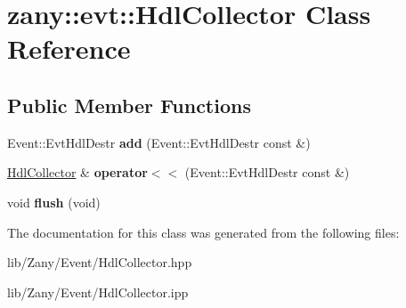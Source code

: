 \hypertarget{classzany_1_1evt_1_1_hdl_collector}{}\section{zany\+:\+:evt\+:\+:Hdl\+Collector Class Reference}
\label{classzany_1_1evt_1_1_hdl_collector}
\subsection*{Public Member Functions}
\begin{DoxyCompactItemize}
\item 
\mbox{\label{classzany_1_1evt_1_1_hdl_collector_af4565ac45b97605568eebecf9308f8c1}} 
Event\+::\+Evt\+Hdl\+Destr {\bfseries add} (Event\+::\+Evt\+Hdl\+Destr const \&)
\item 
\mbox{\label{classzany_1_1evt_1_1_hdl_collector_aa0b0fce2626676b0ecedeaac9995fd45}} 
\hyperlink{classzany_1_1evt_1_1_hdl_collector}{Hdl\+Collector} \& {\bfseries operator$<$$<$} (Event\+::\+Evt\+Hdl\+Destr const \&)
\item 
\mbox{\label{classzany_1_1evt_1_1_hdl_collector_a0598e2ee7d011c08046274a6f4f717b9}} 
void {\bfseries flush} (void)
\end{DoxyCompactItemize}


The documentation for this class was generated from the following files\+:\begin{DoxyCompactItemize}
\item 
lib/\+Zany/\+Event/Hdl\+Collector.\+hpp\item 
lib/\+Zany/\+Event/Hdl\+Collector.\+ipp\end{DoxyCompactItemize}
